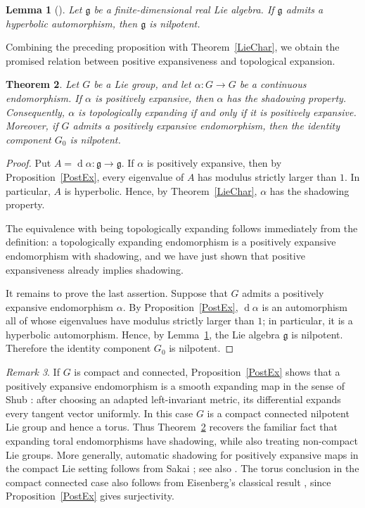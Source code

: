 \documentclass[12pt]{amsart}
\newtheorem{theorem}{Theorem}[section]
\newtheorem{lemma}[theorem]{Lemma}
\theoremstyle{definition}
\numberwithin{equation}{section}
\theoremstyle{remark}
\newtheorem{remark}[theorem]{Remark}
\DeclareMathOperator{\di}{d}
\begin{document}
\begin{lemma}[{\cite[Part~I, \S4, Exercise~21(b)]{BourbakiLie}}]\label{Bou}
	Let $\mathfrak g$ be a finite-dimensional real Lie algebra. If
	$\mathfrak g$ admits a hyperbolic automorphism, then $\mathfrak g$ is
	nilpotent.
\end{lemma}

Combining the preceding proposition with Theorem~\ref{LieChar}, we obtain the promised relation between positive expansiveness and topological expansion.

\begin{theorem}\label{thm:positive-expansive-shadowing}
Let $G$ be a Lie group, and let $\alpha:G\to G$ be a continuous endomorphism.
If $\alpha$ is positively expansive, then $\alpha$ has the shadowing property.
Consequently, $\alpha$ is topologically expanding if and only if it is
positively expansive. Moreover, if $G$ admits a positively expansive
endomorphism, then the identity component $G_0$ is nilpotent.
\end{theorem}

\begin{proof}
Put $A=\di\alpha:\mathfrak g\to\mathfrak g$. If $\alpha$ is positively
expansive, then by Proposition~\ref{PostEx}, every eigenvalue of $A$ has
modulus strictly larger than $1$. In particular, $A$ is hyperbolic. Hence,
by Theorem~\ref{LieChar}, $\alpha$ has the shadowing property.

The equivalence with being topologically expanding follows immediately from
the definition: a topologically expanding endomorphism is a positively
expansive endomorphism with shadowing, and we have just shown that positive
expansiveness already implies shadowing.

It remains to prove the last assertion. Suppose that $G$ admits a positively
expansive endomorphism $\alpha$. By Proposition~\ref{PostEx}, $\di\alpha$
is an automorphism all of whose eigenvalues have modulus strictly larger
than $1$; in particular, it is a hyperbolic automorphism. Hence, by
Lemma~\ref{Bou}, the Lie algebra $\mathfrak g$ is nilpotent. Therefore the
identity component $G_0$ is nilpotent.
\end{proof}

\begin{remark}
If $G$ is compact and connected, Proposition~\ref{PostEx} shows that a
positively expansive endomorphism is a smooth expanding map in the sense of
Shub \cite{Shub1969}: after choosing an adapted left-invariant metric, its
differential expands every tangent vector uniformly. In this case $G$ is a
compact connected nilpotent Lie group and hence a torus. Thus
Theorem~\ref{thm:positive-expansive-shadowing} recovers the familiar fact that
expanding toral endomorphisms have shadowing, while also treating
non-compact Lie groups. More generally, automatic shadowing for positively
expansive maps in the compact Lie setting follows from Sakai
\cite[Theorem~1]{Sakai2003}; see also \cite[Lemma~9]{Sakai2010}. The torus
conclusion in the compact connected case also follows from Eisenberg's
classical result
\cite{EisenbergPositive1966}, since Proposition~\ref{PostEx} gives
surjectivity.
\end{remark}
\end{document}
